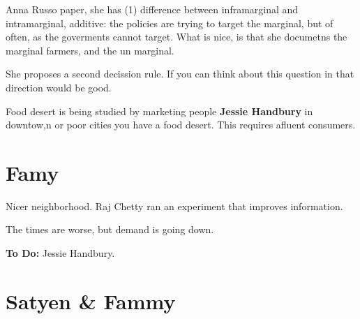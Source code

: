 \documentclass[11pt]{article}
\begin{document}
Anna Russo paper, she has (1) difference between inframarginal and intramarginal, additive: the policies are trying to target the marginal, but of often, as the goverments cannot target. What is nice, is that she documetns the marginal farmers, and the un marginal. 

She proposes a second decission rule. If you can think about this question in that direction would be good. 

Food desert is being studied by marketing people \textbf{Jessie Handbury} in downtow,n or poor cities you have a food desert. This requires afluent consumers.


\section{Famy}

Nicer neighborhood. Raj Chetty ran an experiment that improves information. 

The times are worse, but demand is going down. 

\textbf{To Do:} Jessie Handbury. 

\section{Satyen \& Fammy}






\end{document}
